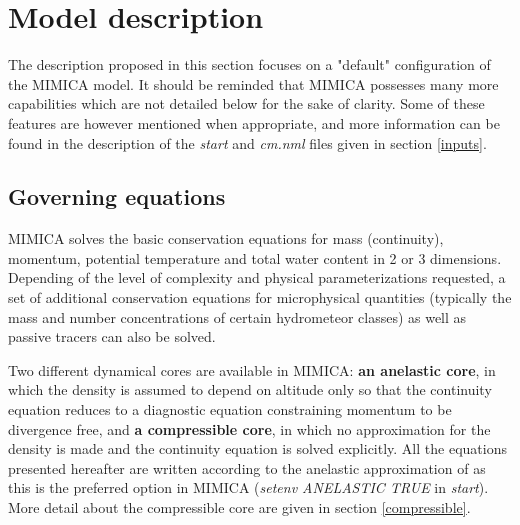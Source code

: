 \documentclass[12pt,A4,french]{article}
\begin{document}
\newpage
\section{Model description}
\label{model}

The description proposed in this section focuses on a "default" configuration of the MIMICA model. It should be reminded that MIMICA possesses many more capabilities which are not detailed below for the sake of clarity. Some of these features are however mentioned when appropriate, and more information can be found in the description of the {\it start} and {\it cm.nml} files given in section \ref{inputs}.

\subsection{Governing equations}

MIMICA solves the basic conservation equations for mass (continuity), momentum, potential temperature and total water content in 2 or 3 dimensions. Depending of the level of complexity and physical parameterizations requested, a set of additional conservation equations for microphysical quantities (typically the mass and number concentrations of certain hydrometeor classes) as well as passive tracers can also be solved. 

Two different dynamical cores are available in MIMICA: {\bf an anelastic core}, in which the density is assumed to depend on altitude only so that the continuity equation reduces to a diagnostic equation constraining momentum to be divergence free, and {\bf a compressible core}, in which no approximation for the density is made and the continuity equation is solved explicitly. All the equations presented hereafter are written according to the anelastic approximation of \cite{LH1982} as this is the preferred option in MIMICA ({\it setenv ANELASTIC TRUE} in {\it start}). More detail about the compressible core are given in section \ref{compressible}.
\end{document}
